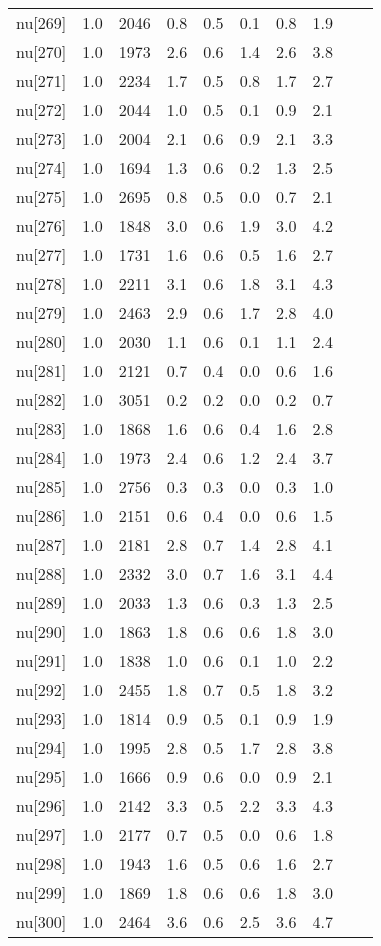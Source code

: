 \begin{longtable}{lrrrrrrr p{} | p{} |}
  nu[269] & 1.0 & 2046 & 0.8 & 0.5 & 0.1 & 0.8 & 1.9 \\ 
  nu[270] & 1.0 & 1973 & 2.6 & 0.6 & 1.4 & 2.6 & 3.8 \\ 
  nu[271] & 1.0 & 2234 & 1.7 & 0.5 & 0.8 & 1.7 & 2.7 \\ 
  nu[272] & 1.0 & 2044 & 1.0 & 0.5 & 0.1 & 0.9 & 2.1 \\ 
  nu[273] & 1.0 & 2004 & 2.1 & 0.6 & 0.9 & 2.1 & 3.3 \\ 
  nu[274] & 1.0 & 1694 & 1.3 & 0.6 & 0.2 & 1.3 & 2.5 \\ 
  nu[275] & 1.0 & 2695 & 0.8 & 0.5 & 0.0 & 0.7 & 2.1 \\ 
  nu[276] & 1.0 & 1848 & 3.0 & 0.6 & 1.9 & 3.0 & 4.2 \\ 
  nu[277] & 1.0 & 1731 & 1.6 & 0.6 & 0.5 & 1.6 & 2.7 \\ 
  nu[278] & 1.0 & 2211 & 3.1 & 0.6 & 1.8 & 3.1 & 4.3 \\ 
  nu[279] & 1.0 & 2463 & 2.9 & 0.6 & 1.7 & 2.8 & 4.0 \\ 
  nu[280] & 1.0 & 2030 & 1.1 & 0.6 & 0.1 & 1.1 & 2.4 \\ 
  nu[281] & 1.0 & 2121 & 0.7 & 0.4 & 0.0 & 0.6 & 1.6 \\ 
  nu[282] & 1.0 & 3051 & 0.2 & 0.2 & 0.0 & 0.2 & 0.7 \\ 
  nu[283] & 1.0 & 1868 & 1.6 & 0.6 & 0.4 & 1.6 & 2.8 \\ 
  nu[284] & 1.0 & 1973 & 2.4 & 0.6 & 1.2 & 2.4 & 3.7 \\ 
  nu[285] & 1.0 & 2756 & 0.3 & 0.3 & 0.0 & 0.3 & 1.0 \\ 
  nu[286] & 1.0 & 2151 & 0.6 & 0.4 & 0.0 & 0.6 & 1.5 \\ 
  nu[287] & 1.0 & 2181 & 2.8 & 0.7 & 1.4 & 2.8 & 4.1 \\ 
  nu[288] & 1.0 & 2332 & 3.0 & 0.7 & 1.6 & 3.1 & 4.4 \\ 
  nu[289] & 1.0 & 2033 & 1.3 & 0.6 & 0.3 & 1.3 & 2.5 \\ 
  nu[290] & 1.0 & 1863 & 1.8 & 0.6 & 0.6 & 1.8 & 3.0 \\ 
  nu[291] & 1.0 & 1838 & 1.0 & 0.6 & 0.1 & 1.0 & 2.2 \\ 
  nu[292] & 1.0 & 2455 & 1.8 & 0.7 & 0.5 & 1.8 & 3.2 \\ 
  nu[293] & 1.0 & 1814 & 0.9 & 0.5 & 0.1 & 0.9 & 1.9 \\ 
  nu[294] & 1.0 & 1995 & 2.8 & 0.5 & 1.7 & 2.8 & 3.8 \\ 
  nu[295] & 1.0 & 1666 & 0.9 & 0.6 & 0.0 & 0.9 & 2.1 \\ 
  nu[296] & 1.0 & 2142 & 3.3 & 0.5 & 2.2 & 3.3 & 4.3 \\ 
  nu[297] & 1.0 & 2177 & 0.7 & 0.5 & 0.0 & 0.6 & 1.8 \\ 
  nu[298] & 1.0 & 1943 & 1.6 & 0.5 & 0.6 & 1.6 & 2.7 \\ 
  nu[299] & 1.0 & 1869 & 1.8 & 0.6 & 0.6 & 1.8 & 3.0 \\ 
  nu[300] & 1.0 & 2464 & 3.6 & 0.6 & 2.5 & 3.6 & 4.7 \\ 
   \end{longtable}